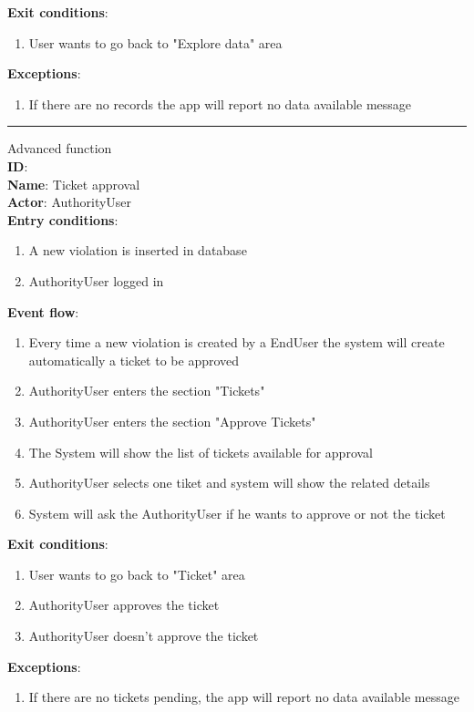   \textbf{Exit conditions}:
  \begin{enumerate}
    \item{User wants to go back to "Explore data" area}
  \end{enumerate}
  \textbf{Exceptions}:
  \begin{enumerate}
    \item{If there are no records the app will report no data available message}
  \end{enumerate}
  \rule{\linewidth}{0.4pt}
\item{Advanced function}\\
		\textbf{ID}:  \\
		\textbf{Name}: Ticket approval  \\
		\textbf{Actor}: AuthorityUser   \\
		\textbf{Entry conditions}:
		\begin{enumerate}
			\item{A new violation is inserted in database}
      \item{AuthorityUser logged in}
		\end{enumerate}
		\textbf{Event flow}:
		\begin{enumerate}
      \item{Every time a new violation is created by a EndUser the system will create automatically a ticket to be approved}
			\item{AuthorityUser enters the section "Tickets"}
			\item{AuthorityUser enters the section "Approve Tickets"}
      \item{The System will show the list of tickets available for approval }
      \item{AuthorityUser selects one tiket and system will show the related details}
      \item{System will ask the AuthorityUser if he wants to approve or not the ticket}
  		\end{enumerate}
		\textbf{Exit conditions}:
    \begin{enumerate}
      \item{User wants to go back to "Ticket" area}
      \item{AuthorityUser approves the ticket}
      \item{AuthorityUser doesn't approve the ticket}
    \end{enumerate}
		\textbf{Exceptions}:
		\begin{enumerate}
			\item{If there are no tickets pending, the app will report no data available message}
		\end{enumerate}
